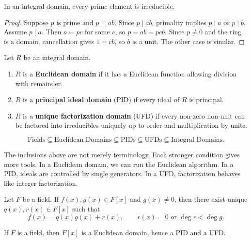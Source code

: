 \begin{proposition}
In an integral domain, every prime element is irreducible.
\end{proposition}

\begin{proof}
Suppose $p$ is prime and $p=ab$. Since $p\mid ab$, primality implies $p\mid a$ or $p\mid b$. Assume $p\mid a$. Then $a=pc$ for some $c$, so $p=ab=pcb$. Since $p\neq 0$ and the ring is a domain, cancellation gives $1=cb$, so $b$ is a unit. The other case is similar.
\end{proof}

\begin{definition}
Let $R$ be an integral domain.
\begin{enumerate}
    \item $R$ is a \textbf{Euclidean domain} if it has a Euclidean function allowing division with remainder.
    \item $R$ is a \textbf{principal ideal domain} (PID) if every ideal of $R$ is principal.
    \item $R$ is a \textbf{unique factorization domain} (UFD) if every non-zero non-unit can be factored into irreducibles uniquely up to order and multiplication by units.
\end{enumerate}
\end{definition}

\begin{theorem}
\[
    \text{Fields}\subseteq \text{Euclidean Domains}\subseteq \text{PIDs}\subseteq \text{UFDs}\subseteq \text{Integral Domains}.
\]
\end{theorem}

\begin{remark}
The inclusions above are not merely terminology. Each stronger condition gives more tools. In a Euclidean domain, we can run the Euclidean algorithm. In a PID, ideals are controlled by single generators. In a UFD, factorization behaves like integer factorization.
\end{remark}

\begin{theorem}
Let $F$ be a field. If $f(x),g(x)\in F[x]$ and $g(x)\neq 0$, then there exist unique $q(x),r(x)\in F[x]$ such that
\[
    f(x)=q(x)g(x)+r(x),
    \qquad
    r(x)=0\text{ or }\deg r<\deg g.
\]
\end{theorem}

\begin{corollary}
If $F$ is a field, then $F[x]$ is a Euclidean domain, hence a PID and a UFD.
\end{corollary}

